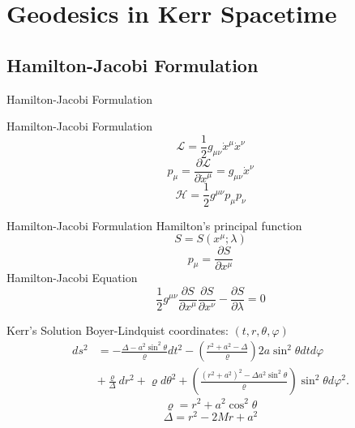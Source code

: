 \documentclass{beamer}
\begin{document}
\section{Geodesics in Kerr Spacetime}    
\begin{darkframes}

\subsection{Hamilton-Jacobi Formulation}
\begin{frame}
\Huge
Hamilton-Jacobi Formulation
\end{frame}

\begin{frame}{Hamilton-Jacobi Formulation}
    \[ \mathcal{L} = \frac{1}{2}  g_{\mu\nu} \dot{x}^\mu \dot{x}^\nu \]
    \pause
    \[ p_\mu = \frac{\partial \mathcal{L}}{\partial \dot{x}^\mu} =  g_{\mu\nu} \dot{x}^\nu \]
    \pause
    \[ \mathcal{H} = \frac{1}{2}  g^{\mu\nu} p_\mu p_\nu \]
\end{frame}

\begin{frame}{Hamilton-Jacobi Formulation}
    Hamilton's principal function
    \[ S = S \left( x^\mu ; \lambda \right)\]
    \pause
    \[ p_\mu = \frac{\partial S}{\partial x^\mu} \]
    \pause
    Hamilton-Jacobi Equation
    \pause
    \[  \frac{1}{2}  g^{\mu\nu} \frac{\partial S}{\partial x^\mu} \frac{\partial S}{\partial x^\nu} - \frac{\partial S}{\partial \lambda} =0 \]
\end{frame}

\begin{frame}{Kerr's Solution}
    	Boyer-Lindquist coordinates: $\left(t,r,\theta,\varphi\right)$
     	\begin{align*}
            ds^{2} &= -\frac{\Delta-a^{2}\sin^{2}\theta}{\varrho}dt^{2}-\left(\frac{r^{2}+a^{2}-\Delta}{\varrho}\right)2a\sin^{2}\theta dtd\varphi\nonumber \\
             & +\frac{\varrho}{\Delta}dr^{2}+\varrho d\theta^{2}+\left(\frac{\left(r^{2}+a^{2}\right)^{2}-\Delta a^{2}\sin^{2}\theta}{\varrho}\right)\sin^{2}\theta d\varphi^{2}.
      	\end{align*}
     	\pause
   	$$\varrho  = r^{2}+a^{2}\cos^{2}\theta$$
    $$\Delta =  r^{2}-2Mr+a^{2}$$
\end{frame}


\end{darkframes}
\end{document}
